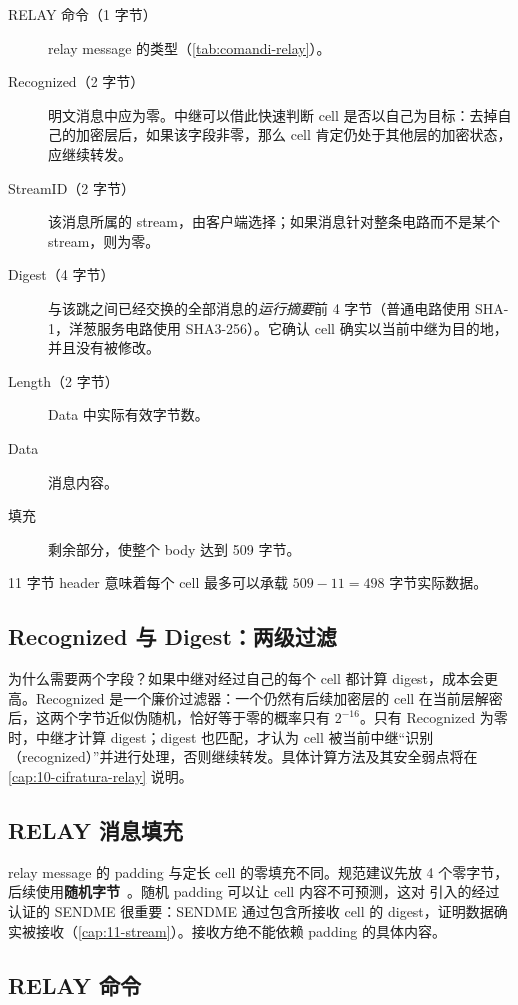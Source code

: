 \begin{description}
  \item[RELAY 命令（1 字节）] relay message 的类型（\cref{tab:comandi-relay}）。
  \item[Recognized（2 字节）] 明文消息中应为零。中继可以借此快速判断 cell 是否以自己为目标：去掉自己的加密层后，如果该字段非零，那么 cell 肯定仍处于其他层的加密状态，应继续转发。
  \item[StreamID（2 字节）] 该消息所属的 stream，由客户端选择；如果消息针对整条电路而不是某个 stream，则为零。
  \item[Digest（4 字节）] 与该跳之间已经交换的全部消息的\emph{运行摘要}前 4 字节（普通电路使用 SHA-1，洋葱服务电路使用 SHA3-256）。它确认 cell 确实以当前中继为目的地，并且没有被修改。
  \item[Length（2 字节）] Data 中实际有效字节数。
  \item[Data] 消息内容。
  \item[填充] 剩余部分，使整个 body 达到 509 字节。
\end{description}

11 字节 header 意味着每个 cell 最多可以承载 $509 - 11 = 498$ 字节实际数据。

\subsection{Recognized 与 Digest：两级过滤}

为什么需要两个字段？如果中继对经过自己的每个 cell 都计算 digest，成本会更高。Recognized 是一个廉价过滤器：一个仍然有后续加密层的 cell 在当前层解密后，这两个字节近似伪随机，恰好等于零的概率只有 $2^{-16}$。只有 Recognized 为零时，中继才计算 digest；digest 也匹配，才认为 cell 被当前中继\enquote{识别（recognized）}并进行处理，否则继续转发。具体计算方法及其安全弱点将在 \cref{cap:10-cifratura-relay} 说明。

\subsection{RELAY 消息填充}

relay message 的 padding 与定长 cell 的零填充不同。规范建议先放 4 个零字节，后续使用\textbf{随机字节}~。随机 padding 可以让 cell 内容不可预测，这对  引入的经过认证的 SENDME 很重要：SENDME 通过包含所接收 cell 的 digest，证明数据确实被接收（\cref{cap:11-stream}）。接收方绝不能依赖 padding 的具体内容。

\subsection{RELAY 命令}

